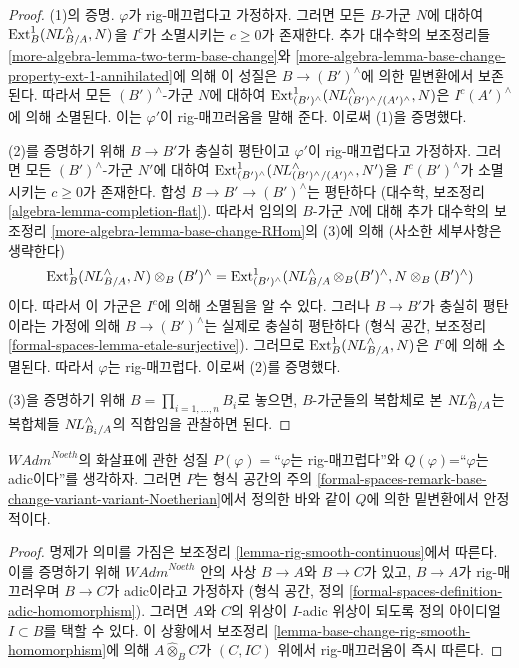 \begin{proof}
\medskip\noindent
(1)의 증명. $\varphi$가 rig-매끄럽다고 가정하자. 그러면 모든 $B$-가군 $N$에 대하여
$\mathop{\mathrm{Ext}}\nolimits^1_B(\mathop{N\!L}\nolimits_{B/A}^\wedge, N)$을 $I^c$가 소멸시키는 $c \geq 0$가 존재한다.
추가 대수학의 보조정리들
\ref{more-algebra-lemma-two-term-base-change}와
\ref{more-algebra-lemma-base-change-property-ext-1-annihilated}에 의해
이 성질은 $B \to (B')^\wedge$에 의한 밑변환에서 보존된다.
따라서 모든 $(B')^\wedge$-가군 $N$에 대하여
$\mathop{\mathrm{Ext}}\nolimits^1_{(B')^\wedge}(\mathop{N\!L}\nolimits_{(B')^\wedge/(A')^\wedge}^\wedge, N)$은
$I^c(A')^\wedge$에 의해 소멸된다. 이는 $\varphi'$이 rig-매끄러움을 말해 준다.
이로써 (1)을 증명했다.

\medskip\noindent
(2)를 증명하기 위해 $B \to B'$가 충실히 평탄이고 $\varphi'$이
rig-매끄럽다고 가정하자. 그러면 모든 $(B')^\wedge$-가군 $N'$에 대하여
$\mathop{\mathrm{Ext}}\nolimits^1_{(B')^\wedge}(\mathop{N\!L}\nolimits_{(B')^\wedge/(A')^\wedge}^\wedge, N')$을
$I^c(B')^\wedge$가 소멸시키는 $c \geq 0$가 존재한다.
합성 $B \to B' \to (B')^\wedge$는 평탄하다
(대수학, 보조정리 \ref{algebra-lemma-completion-flat}). 따라서 임의의 $B$-가군 $N$에 대해
추가 대수학의 보조정리 \ref{more-algebra-lemma-base-change-RHom}의 (3)에 의해
(사소한 세부사항은 생략한다)
$$
\mathop{\mathrm{Ext}}\nolimits^1_B(\mathop{N\!L}\nolimits_{B/A}^\wedge, N) \otimes_B (B')^\wedge =
\mathop{\mathrm{Ext}}\nolimits^1_{(B')^\wedge}(\mathop{N\!L}\nolimits_{B/A}^\wedge \otimes_B (B')^\wedge,
N \otimes_B (B')^\wedge)
$$
이다. 따라서 이 가군은 $I^c$에 의해 소멸됨을 알 수 있다.
그러나 $B \to B'$가 충실히 평탄이라는 가정에 의해
$B \to (B')^\wedge$는 실제로 충실히 평탄하다
(형식 공간, 보조정리 \ref{formal-spaces-lemma-etale-surjective}).
그러므로 $\mathop{\mathrm{Ext}}\nolimits^1_B(\mathop{N\!L}\nolimits_{B/A}^\wedge, N)$은 $I^c$에 의해 소멸된다.
따라서 $\varphi$는 rig-매끄럽다. 이로써 (2)를 증명했다.

\medskip\noindent
(3)을 증명하기 위해 $B = \prod_{i = 1, \ldots, n} B_i$로 놓으면,
$B$-가군들의 복합체로 본 $\mathop{N\!L}\nolimits_{B/A}^\wedge$는 복합체들
$\mathop{N\!L}\nolimits_{B_i/A}^\wedge$의 직합임을 관찰하면 된다.
\end{proof}

\begin{lemma}
\label{lemma-base-change-rig-smooth-continuous}
$\textit{WAdm}^{Noeth}$의 화살표에 관한 성질
$P(\varphi)=$``$\varphi$는 rig-매끄럽다''와
$Q(\varphi)$=``$\varphi$는 adic이다''를 생각하자.
그러면 $P$는 형식 공간의 주의
\ref{formal-spaces-remark-base-change-variant-variant-Noetherian}에서
정의한 바와 같이 $Q$에 의한 밑변환에서 안정적이다.
\end{lemma}

\begin{proof}
명제가 의미를 가짐은 보조정리 \ref{lemma-rig-smooth-continuous}에서 따른다.
이를 증명하기 위해 $\textit{WAdm}^{Noeth}$ 안의 사상
$B \to A$와 $B \to C$가 있고, $B \to A$가 rig-매끄러우며
$B \to C$가 adic이라고 가정하자
(형식 공간, 정의 \ref{formal-spaces-definition-adic-homomorphism}).
그러면 $A$와 $C$의 위상이 $I$-adic 위상이 되도록
정의 아이디얼 $I \subset B$를 택할 수 있다. 이 상황에서 보조정리
\ref{lemma-base-change-rig-smooth-homomorphism}에 의해
$A \widehat{\otimes}_B C$가 $(C, IC)$ 위에서 rig-매끄러움이 즉시 따른다.
\end{proof}

